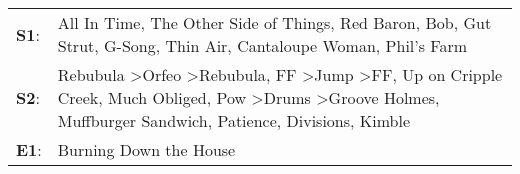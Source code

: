 \begin{supertabular}{p{0.03\textwidth}p{0.92\textwidth}}
 \textbf{S1}:  &                                                                                                                                                                                                                                                                                  All In Time\textsuperscript{}, \enspace The Other Side of Things\textsuperscript{}, \enspace Red Baron\textsuperscript{}, \enspace Bob\textsuperscript{}, \enspace Gut Strut\textsuperscript{}, \enspace G-Song\textsuperscript{}, \enspace Thin Air\textsuperscript{}, \enspace Cantaloupe Woman\textsuperscript{}, \enspace Phil's Farm\textsuperscript{}  \enspace  \\
 \textbf{S2}:  &  Rebubula\textsuperscript{} \textgreater \enspace Orfeo\textsuperscript{} \textgreater \enspace Rebubula\textsuperscript{}, \enspace FF\textsuperscript{} \textgreater \enspace Jump\textsuperscript{} \textgreater \enspace FF\textsuperscript{}, \enspace Up on Cripple Creek\textsuperscript{}, \enspace Much Obliged\textsuperscript{}, \enspace Pow\textsuperscript{} \textgreater \enspace Drums\textsuperscript{} \textgreater \enspace Groove Holmes\textsuperscript{}, \enspace Muffburger Sandwich\textsuperscript{}, \enspace Patience\textsuperscript{}, \enspace Divisions\textsuperscript{}, \enspace Kimble\textsuperscript{}  \enspace  \\
 \textbf{E1}:  &                                                                                                                                                                                                                                                                                                                                                                                                                                                                                                                                                                                                     Burning Down the House\textsuperscript{}  \enspace  \\
\end{supertabular}
